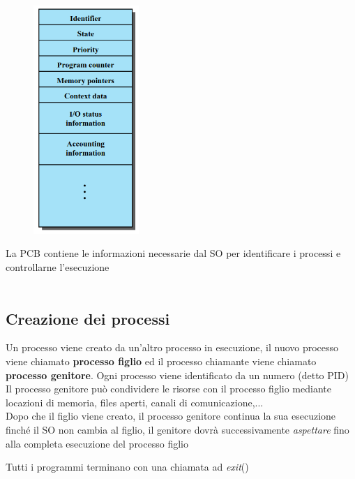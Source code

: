 \documentclass[12pt, a4paper]{article}
\begin{document}
	\begin{figure}[!htbp]
		\centering
		\includegraphics[width=4cm]{SO_PNGs/process-control-block_SO.png}
		\label{fig:process-control-block}
	\end{figure}

	La PCB contiene le informazioni necessarie dal SO per identificare i processi e controllarne l'esecuzione \\\\
	
	\subsection*{Creazione dei processi} 
	Un processo viene creato da un'altro processo in esecuzione, il nuovo processo viene chiamato \textbf{processo figlio} ed il processo chiamante viene chiamato \textbf{processo genitore}. Ogni processo viene identificato da un numero (detto PID)\\
	Il processo genitore può condividere le risorse con il processo figlio mediante locazioni di memoria, files aperti, canali di comunicazione,... \\
	Dopo che il figlio viene creato, il processo genitore continua la sua esecuzione finché il SO non cambia al figlio, il genitore dovrà successivamente \textit{aspettare} fino alla completa esecuzione del processo figlio
	
	Tutti i programmi terminano con una chiamata ad \textit{exit}()
	
	
	
\end{document}

